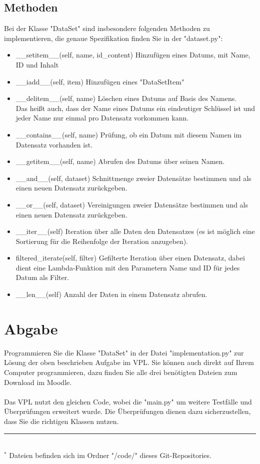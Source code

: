 \documentclass[]{article}
\begin{document}
\subsection{Methoden}
Bei der Klasse "DataSet" sind insbesondere folgenden Methoden zu implementieren, die genaue Spezifikation finden Sie in der "dataset.py":\\
\begin{itemize}
    \item \_\_setitem\_\_(self, name, id\_content) Hinzufügen eines Datums, mit Name, ID und Inhalt
    \item \_\_iadd\_\_(self, item) Hinzufügen eines "DataSetItem"
    \item \_\_delitem\_\_(self, name) Löschen eines Datums auf Basis des Namens.\\ Das heißt auch, dass der Name eines Datums ein eindeutiger Schlüssel ist und jeder Name nur einmal pro Datensatz vorkommen kann.
    \item \_\_contains\_\_(self, name) Prüfung, ob ein Datum mit diesem Namen im Datensatz vorhanden ist.
    \item \_\_getitem\_\_(self, name) Abrufen des Datums über seinen Namen.
    \item \_\_and\_\_(self, dataset) Schnittmenge zweier Datensätze bestimmen und als einen neuen Datensatz zurückgeben.
    \item \_\_or\_\_(self, dataset) Vereinigungen zweier Datensätze bestimmen und als einen neuen Datensatz zurückgeben.
    \item \_\_iter\_\_(self) Iteration über alle Daten den Datensatzes (es ist möglich eine Sortierung für die Reihenfolge der Iteration anzugeben).
    \item filtered\_iterate(self, filter) Gefilterte Iteration über einen Datensatz, dabei dient eine Lambda-Funktion mit den Parametern Name und ID für jedes Datum als Filter.
    \item \_\_len\_\_(self) Anzahl der Daten in einem Datensatz abrufen.\\
\end{itemize}

\section{Abgabe}
Programmieren Sie die Klasse "DataSet" in der Datei "implementation.py" zur Lösung der oben beschrieben Aufgabe im VPL.
Sie können auch direkt auf Ihrem Computer programmieren, dazu finden Sie alle drei benötigten Dateien zum Download im Moodle.\\
\\
Das VPL nutzt den gleichen Code, wobei die "main.py" um weitere Testfälle und Überprüfungen erweitert wurde.
Die Überprüfungen dienen dazu sicherzustellen, dass Sie die richtigen Klassen nutzen.\\
%
\hrule\hfill\\[0.2cm]
$^*$ Dateien befinden sich im Ordner "/code/" dieses Git-Repositories.
\end{document}
